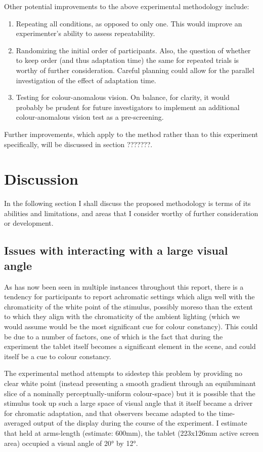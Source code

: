 Other potential improvements to the above experimental methodology include:

\begin{enumerate}
    \item Repeating all conditions, as opposed to only one. This would improve an experimenter's ability to assess repeatability.
    \item Randomizing the initial order of participants. Also, the question of whether to keep order (and thus adaptation time) the same for repeated trials is worthy of further consideration. Careful planning could allow for the parallel investigation of the effect of adaptation time.
    \item Testing for colour-anomalous vision. On balance, for clarity, it would probably be prudent for future investigators to implement an additional colour-anomalous vision test as a pre-screening.
\end{enumerate}

Further improvements, which apply to the method rather than to this experiment specifically, will be discussed in section ???????.

\section{Discussion}

In the following section I shall discuss the proposed methodology is terms of its abilities and limitations, and areas that I consider worthy of further consideration or development.

\subsection{Issues with interacting with a large visual angle}

As has now been seen in multiple instances throughout this report, there is a tendency for participants to report achromatic settings which align well with the chromaticity of the white point of the stimulus, possibly moreso than the extent to which they align with the chromaticity of the ambient lighting (which we would assume would be the most significant cue for colour constancy). This could be due to a number of factors, one of which is the fact that during the experiment the tablet itself becomes a significant element in the scene, and could itself be a cue to colour constancy. 

The experimental method attempts to sidestep this problem by providing no clear white point (instead presenting a smooth gradient through an equiluminant slice of a nominally perceptually-uniform colour-space) but it is possible that the stimulus took up such a large space of visual angle that it itself became a driver for chromatic adaptation, and that observers became adapted to the time-averaged output of the display during the course of the experiment. I estimate that held at arms-length (estimate: 600mm), the tablet (223x126mm active screen area) occupied a visual angle of 20° by 12°.

